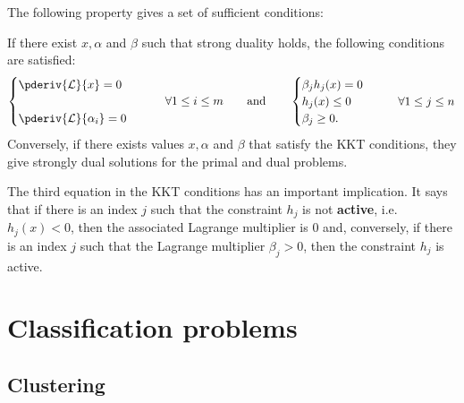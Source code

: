     The following property gives a set of sufficient conditions:
    \begin{property}
        If there exist $x,\alpha$ and $\beta$ such that strong duality holds, the following conditions are satisfied:
        \begin{align}
            \begin{cases}
                \pderiv{\mathcal{L}}{x} = 0\\\\
                \pderiv{\mathcal{L}}{\alpha_i} = 0
            \end{cases}
            \qquad\forall1\leq i\leq m\qquad\text{and}\qquad
            \begin{cases}
                \beta_jh_j(x) = 0\\
                h_j(x)\leq0&\qquad\forall1\leq j\leq n\\
                \beta_j\geq0.
            \end{cases}
        \end{align}
        Conversely, if there exists values $x,\alpha$ and $\beta$ that satisfy the KKT conditions, they give strongly dual solutions for the primal and dual problems.
    \end{property}
    \begin{remark}\label{data:slackness}
        The third equation in the KKT conditions has an important implication. It says that if there is an index $j$ such that the constraint $h_j$ is not \textbf{active}, i.e. $h_j(x)<0$, then the associated Lagrange multiplier is 0 and, conversely, if there is an index $j$ such that the Lagrange multiplier $\beta_j>0$, then the constraint $h_j$ is active.
    \end{remark}


\section{Classification problems}
\subsection{Clustering}

